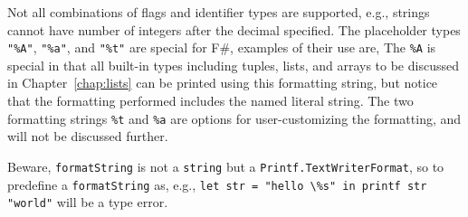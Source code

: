 %
%
Not all combinations of flags and identifier types are supported, e.g., strings cannot have number of integers after the decimal specified.
The placeholder types \lstinline{"%A"}, \lstinline{"%a"}, and \lstinline{"%t"} are special for F\#, examples of their use are,
%
%
The \lstinline!%A! is special in that all built-in types including tuples, lists, and arrays to be discussed in Chapter~\ref{chap:lists} can be printed using this formatting string, but notice that the formatting performed includes the named literal string. The two formatting strings \lstinline!%t! and \lstinline!%a! are options for user-customizing the formatting, and will not be discussed further.

Beware, \lstinline[language=ebnf]!formatString! is not a \lstinline!string! but a \lstinline!Printf.TextWriterFormat!, so to predefine a \lstinline[language=ebnf]!formatString! as, e.g., \mbox{\lstinline{let str = "hello \%s" in printf str "world"}} will be a type error.


